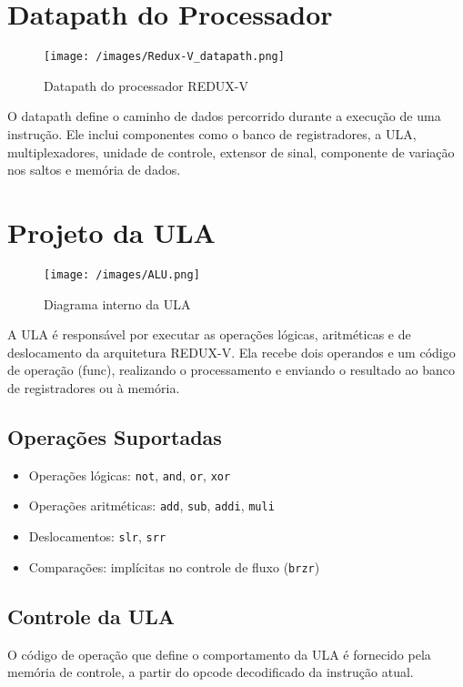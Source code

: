 \documentclass[12pt]{article}
\begin{document}
\section{Datapath do Processador}

\begin{figure}[H]
\centering
\texttt{[image: /images/Redux-V\_datapath.png]}
\caption{Datapath do processador REDUX-V}
\label{fig:datapath}
\end{figure}

O datapath define o caminho de dados percorrido durante a execução de uma instrução. Ele inclui componentes como o banco de registradores, a ULA, multiplexadores, unidade de controle, extensor de sinal, componente de variação nos saltos e memória de dados.

\section{Projeto da ULA}

\begin{figure}[H]
\centering
\texttt{[image: /images/ALU.png]}
\caption{Diagrama interno da ULA}
\label{fig:ula}
\end{figure}

A ULA é responsável por executar as operações lógicas, aritméticas e de deslocamento da arquitetura REDUX-V. Ela recebe dois operandos e um código de operação (func), realizando o processamento e enviando o resultado ao banco de registradores ou à memória.

\subsection{Operações Suportadas}
\begin{itemize}
  \item Operações lógicas: \texttt{not}, \texttt{and}, \texttt{or}, \texttt{xor}
  \item Operações aritméticas: \texttt{add}, \texttt{sub}, \texttt{addi}, \texttt{muli}
  \item Deslocamentos: \texttt{slr}, \texttt{srr}
  \item Comparações: implícitas no controle de fluxo (\texttt{brzr})
\end{itemize}

\subsection{Controle da ULA}
O código de operação que define o comportamento da ULA é fornecido pela memória de controle, a partir do opcode decodificado da instrução atual.
\end{document}
